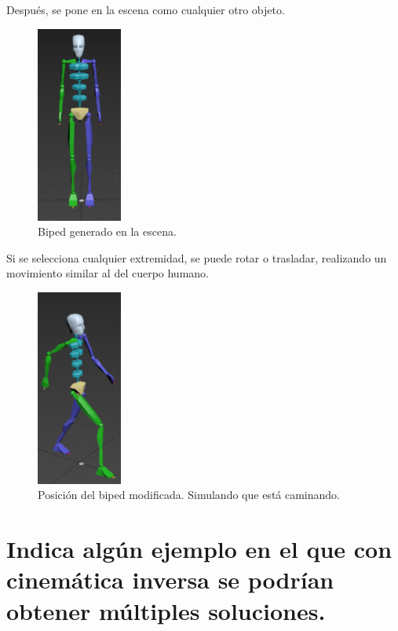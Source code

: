 \documentclass[]{article}
\begin{document}
Después, se pone en la escena como cualquier otro objeto.

\begin{figure}[H]
   \centering
   \includegraphics[width=0.25\textwidth]{imagenes/biped.png}
   \caption{Biped generado en la escena.}
\end{figure}

Si se selecciona cualquier extremidad, se puede rotar o trasladar, realizando un movimiento similar al del cuerpo humano.

\begin{figure}[H]
   \centering
   \includegraphics[width=0.25\textwidth]{imagenes/bipedWalk.png}
   \caption{Posición del biped modificada. Simulando que está caminando.}
\end{figure}

\newpage

\section{Indica algún ejemplo en el que con cinemática inversa se podrían obtener múltiples soluciones.}
\end{document}
